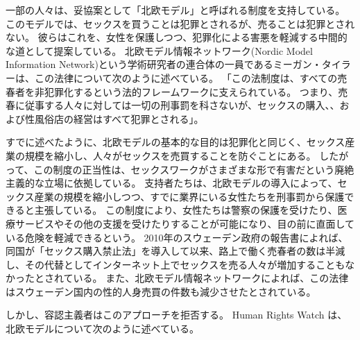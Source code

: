 \documentclass[paper=a4,book,openany]{jlreq}
\begin{document}
一部の人々は、妥協案として「北欧モデル」と呼ばれる制度を支持している。
このモデルでは、セックスを買うことは犯罪とされるが、売ることは犯罪とされない。
彼らはこれを、女性を保護しつつ、犯罪化による害悪を軽減する中間的な道として提案している。
北欧モデル情報ネットワーク(Nordic Model Information Network)という学術研究者の連合体の一員であるミーガン・タイラーは、この法律について次のように述べている。
「この法制度は、すべての売春者を非犯罪化するという法的フレームワークに支えられている。
つまり、売春に従事する人々に対しては一切の刑事罰を科さないが、セックスの購入、、および性風俗店の経営はすべて犯罪とされる」\citep{woodward16:_calls_austr_adopt_nordic_model_prost}。

すでに述べたように、北欧モデルの基本的な目的は犯罪化と同じく、セックス産業の規模を縮小し、人々がセックスを売買することを防ぐことにある。
したがって、この制度の正当性は、セックスワークがさまざまな形で有害だという廃絶主義的な立場に依拠している。
支持者たちは、北欧モデルの導入によって、セックス産業の規模を縮小しつつ、すでに業界にいる女性たちを刑事罰から保護できると主張している。
この制度により、女性たちは警察の保護を受けたり、医療サービスやその他の支援を受けたりすることが可能になり、目の前に直面している危険を軽減できるという。
2010年のスウェーデン政府の報告書によれば、同国が「セックス購入禁止法」を導入して以来、路上で働く売春者の数は半減し、その代替としてインターネット上でセックスを売る人々が増加することもなかったとされている\citep{sweden10:_repor_sou}。
また、北欧モデル情報ネットワークによれば、この法律はスウェーデン国内の性的人身売買の件数も減少させたとされている\citep[p.25]{commons16:_prost}。

しかし、容認主義者はこのアプローチを拒否する。
Human Rights Watch は、北欧モデルについて次のように述べている。
\end{document}
